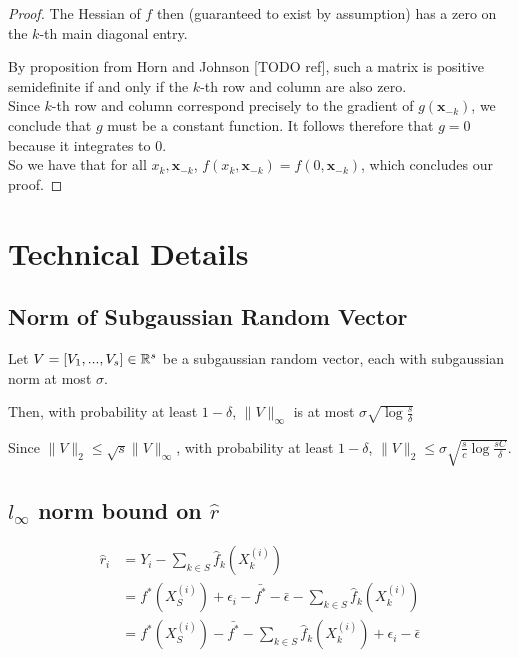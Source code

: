 \documentclass{article}
\begin{document}
\begin{proof}
The Hessian of $f$ then (guaranteed to exist by assumption) has a zero on the $k$-th main diagonal entry. 

By proposition from Horn and Johnson [TODO ref], such a matrix is positive semidefinite if and only if the $k$-th row and column are also zero. \\

Since $k$-th row and column correspond precisely to the gradient of $g(\mathbf{x}_{-k})$, we conclude that $g$ must be a constant function. It follows therefore that $g = 0$ because it integrates to 0. \\

So we have that for all $x_k, \mathbf{x}_{-k}$, $f(x_k, \mathbf{x}_{-k}) = f(0, \mathbf{x}_{-k})$, which concludes our proof.

\end{proof}

 
\section{Technical Details}

\subsection{Norm of Subgaussian Random Vector}

Let $V = [V_1,...,V_s] \in \mathbb{R}^s$ be a subgaussian random vector, each with subgaussian norm at most $\sigma$. 

Then, with probability at least $1-\delta$, $\| V \|_\infty$ is at most $\sigma \sqrt{ \log \frac{s}{\delta}}$

Since $\|V\|_2 \leq \sqrt{s} \| V\|_\infty$, with probability at least $1-\delta$, $\| V \|_2 \leq \sigma \sqrt{\frac{s}{c} \log \frac{sC}{\delta}}$.

\subsection{$l_\infty$ norm bound on $\hat{r}$}

\begin{align*}
\hat{r}_i &= Y_i - \sum_{k \in S} \hat{f}_k (X_k^{(i)}) \\
	&= f^*(X_S^{(i)}) + \epsilon_i - \bar{f^*} - \bar{\epsilon}- \sum_{k \in S} \hat{f}_k(X_k^{(i)}) \\
	&=  f^*(X_S^{(i)}) - \bar{f^*} - \sum_{k \in S} \hat{f}_k(X_k^{(i)}) + \epsilon_i - \bar{\epsilon}
\end{align*}
\end{document}
